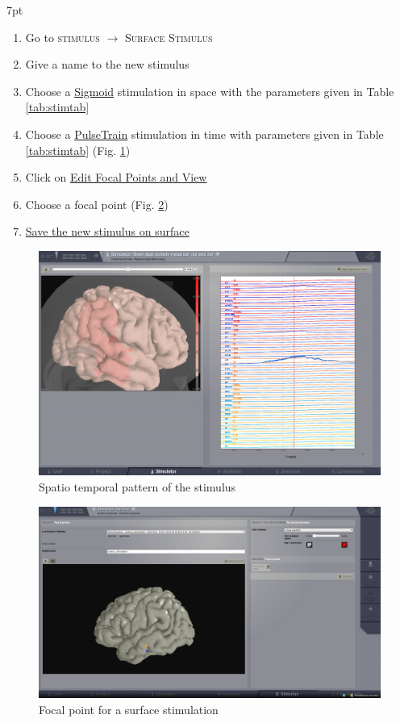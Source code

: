 \documentclass{tufte-handout}
\newenvironment{formal}{%
  \def\FrameCommand{%
    \hspace{1pt}%
    {\color{DarkBlue}\vrule width 2pt}%
    {\color{formalshade}\vrule width 4pt}%
    \colorbox{formalshade}%
  }%
  \MakeFramed{\advance\hsize-\width\FrameRestore}%
  \noindent\hspace{-4.55pt}%
  \begin{adjustwidth}{}{7pt}%
  \vspace{2pt}\vspace{2pt}%
}
{%
  \vspace{2pt}\end{adjustwidth}\endMakeFramed%
}
\begin{document}
  \begin{formal}
  \begin{enumerate}
  \item Go to \textsc{stimulus} $\rightarrow$ \textsc{Surface Stimulus}
  \item Give a name to the new stimulus
  \item Choose a \underline{Sigmoid} stimulation in space with the parameters given in Table \ref{tab:stimtab}
  \item Choose a \underline{PulseTrain} stimulation in time with parameters given in Table \ref{tab:stimtab} (Fig. \ref{fig:stim_st})
  \item Click on \underline{Edit Focal Points and View}
  \item Choose a focal point (Fig. \ref{fig:stim_foc})
  \item \underline{Save the new stimulus on surface}
  \end{enumerate}
\end{formal}


\begin{figure}[h]
  \includegraphics[width=\linewidth]{Handout_UI_ModellingEpilepsy_SpatialAverage}%
  \caption{Spatio temporal pattern of the stimulus}%
  \label{fig:stim_st}%
\end{figure}

\begin{figure}[h]
  \includegraphics[width=\linewidth]{Handout_UI_ModellingAnEpilepticPatient_StimulationFocalPoint}%
  \caption{Focal point for a surface stimulation}%
  \label{fig:stim_foc}%
\end{figure}
\end{document}
